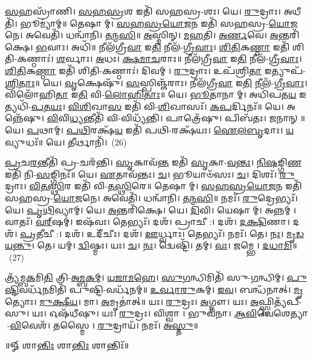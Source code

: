\-\ul{𑌸}\-𑌹𑌸𑍍𑌰𑌾᳴𑌣𑌿। \ul{𑌸}\-\-\ul{𑌹}\-\-\ul{𑌸𑍍𑌰}\-𑌶 𑌇𑌤𑌿᳴ 𑌸𑌹𑌸𑍍𑌰-𑌶𑌃। 𑌯𑍇। \ul{𑌰𑍁}\-𑌦𑍍𑌰𑌾𑌃। 𑌅𑌧𑍀𑌤𑌿᳴। 𑌭𑍂𑌮𑍍𑌯𑌾॑𑌮𑍍॥ 
𑌤𑍇𑌷𑌾𑌮𑍍। \ul{𑌸}\-\-\ul{𑌹}\-\-\ul{𑌸𑍍𑌰}\-\-\ul{𑌯𑍋}\-\-\ul{𑌜}\-𑌨 𑌇𑌤𑌿᳴ 𑌸𑌹𑌸𑍍𑌰-\-\ul{𑌯𑍋}\-\-\ul{𑌜}\-𑌨𑍇। 𑌅𑌵𑍇𑌤𑌿᳴। 𑌧𑌨𑍍𑌵𑌾᳴𑌨𑌿। \ul{𑌤}\-\-\ul{𑌨𑍍𑌮}\-\-\ul{𑌸𑌿}\-॥ 
\-\ul{𑌅}\-𑌸𑍍𑌮𑌿𑌨𑍍। \ul{𑌮}\-\-\ul{𑌹}\-𑌤𑌿। \ul{𑌅}\-\-\ul{𑌰𑍍𑌣}\-𑌵𑍇। \ul{𑌅}\-𑌨𑍍𑌤𑌰𑌿᳴𑌕𑍍𑌷𑍇। \ul{𑌭}\-𑌵𑌾𑌃। 𑌅𑌧𑌿᳴॥ 
𑌨𑍀𑌲᳴𑌗𑍍𑌰𑍀\-\ul{𑌵𑌾} 𑌇\-\ul{𑌤𑌿} 𑌨𑍀𑌲᳴-\-\ul{𑌗𑍍𑌰𑍀}\-\-\ul{𑌵𑌾𑌃}\-। \ul{𑌶𑌿}\-\-\ul{𑌤𑌿}\-𑌕\-\ul{𑌣𑍍𑌠𑌾} 𑌇𑌤𑌿᳴ 𑌶𑌿𑌤𑌿-𑌕𑌣𑍍𑌠𑌾𑌃॑। \ul{𑌶}\-𑌰𑍍𑌵𑌾𑌃। \ul{𑌅}\-𑌧𑌃। \ul{𑌕𑍍𑌷}\-\-\ul{𑌮𑌾}\-\-\ul{𑌚}\-𑌰𑌾𑌃॥ 
𑌨𑍀𑌲᳴𑌗𑍍𑌰𑍀\-\ul{𑌵𑌾} 𑌇\-\ul{𑌤𑌿} 𑌨𑍀𑌲᳴-\-\ul{𑌗𑍍𑌰𑍀}\-\-\ul{𑌵𑌾𑌃}\-। \ul{𑌶𑌿}\-\-\ul{𑌤𑌿}\-𑌕\-\ul{𑌣𑍍𑌠𑌾} 𑌇𑌤𑌿᳴ 𑌶𑌿𑌤𑌿-𑌕𑌣𑍍𑌠𑌾𑌃॑। 𑌦𑌿𑌵𑌮𑍍। \ul{𑌰𑍁}\-𑌦𑍍𑌰𑌾𑌃। 𑌉𑌪᳴𑌶𑍍𑌰𑌿\-\ul{𑌤𑌾} 𑌇𑌤𑍍𑌯𑍁𑌪᳴-\-\ul{𑌶𑍍𑌰𑌿}\-\-\ul{𑌤𑌾𑌃}\-॥ 
𑌯𑍇। \ul{𑌵𑍃}\-𑌕𑍍𑌷𑍇𑌷𑍁᳴। \ul{𑌸}\-𑌸𑍍𑌪𑌿𑌞𑍍𑌜᳴𑌰𑌾𑌃। 𑌨𑍀𑌲᳴𑌗𑍍𑌰𑍀\-\ul{𑌵𑌾} 𑌇\-\ul{𑌤𑌿} 𑌨𑍀𑌲᳴-\-\ul{𑌗𑍍𑌰𑍀}\-\-\ul{𑌵𑌾𑌃}\-। 𑌵𑌿𑌲𑍋᳴𑌹𑌿\-\ul{𑌤𑌾} 𑌇\-\ul{𑌤𑌿} 𑌵𑌿-\-\ul{𑌲𑍋}\-\-\ul{𑌹𑌿}\-\-\ul{𑌤𑌾𑌃}\-॥ 
𑌯𑍇। \ul{𑌭𑍂}\-𑌤𑌾𑌨𑌾𑌮𑍍। 𑌅𑌧𑌿᳴𑌪𑌤\-\ul{𑌯} 𑌇𑌤𑍍𑌯𑌧𑌿᳴-\-\ul{𑌪}\-\-\ul{𑌤}\-\-\ul{𑌯𑌃}\-। \ul{𑌵𑌿}\-\-\ul{𑌶𑌿}\-𑌖𑌾\-\ul{𑌸} 𑌇𑌤𑌿᳴ 𑌵𑌿-\-\ul{𑌶𑌿}\-𑌖𑌾𑌸𑌃᳴। \ul{𑌕}\-\-\ul{𑌪}\-𑌰𑍍𑌦𑌿𑌨𑌃᳴॥ 
𑌯𑍇। 𑌅𑌨𑍍𑌨𑍇᳴𑌷𑍁। \ul{𑌵𑌿}\-𑌵𑌿\-\ul{𑌧𑍍𑌯}\-𑌨𑍍𑌤𑍀𑌤𑌿᳴ 𑌵𑌿-𑌵𑌿𑌧𑍍𑌯᳴𑌨𑍍𑌤𑌿। 𑌪𑌾𑌤𑍍𑌰𑍇᳴𑌷𑍁। 𑌪𑌿𑌬᳴𑌤𑌃। 𑌜𑌨𑌾𑌨𑍍॥ 
𑌯𑍇। \ul{𑌪}\-𑌥𑌾𑌮𑍍। \ul{𑌪}\-\-\ul{𑌥𑌿}\-𑌰𑌕𑍍𑌷᳴\-\ul{𑌯} 𑌇𑌤𑌿᳴ 𑌪𑌥𑌿-𑌰𑌕𑍍𑌷᳴𑌯𑌃। \ul{𑌐}\-\-\ul{𑌲}\-\-\ul{𑌬𑍃}\-𑌦𑌾𑌃। \ul{𑌯}\-𑌵𑍍𑌯𑍁𑌧𑌃᳴॥ 
𑌯𑍇। \ul{𑌤𑍀}\-𑌰𑍍𑌥𑌾𑌨𑌿᳴।~(26)


\-\ul{𑌪𑍍𑌰}\-𑌚\-\ul{𑌰}\-𑌨𑍍𑌤𑍀𑌤𑌿᳴ 𑌪𑍍𑌰-𑌚𑌰᳴𑌨𑍍𑌤𑌿। \ul{𑌸𑍃}\-𑌕𑌾𑌵᳴\-\ul{𑌨𑍍𑌤} 𑌇𑌤𑌿᳴ \ul{𑌸𑍃}\-𑌕𑌾-\-\ul{𑌵}\-\-\ul{𑌨𑍍𑌤𑌃}\-। \ul{𑌨𑌿}\-\-\ul{𑌷}\-𑌙𑍍𑌗𑌿\-\ul{𑌣} 𑌇𑌤𑌿᳴ 𑌨𑌿-\-\ul{𑌸}\-𑌙𑍍𑌗𑌿𑌨𑌃᳴॥ 
𑌯𑍇। \ul{𑌏}\-𑌤𑌾𑌵᳴𑌨𑍍𑌤𑌃। \ul{𑌚}\-। 𑌭𑍂𑌯𑌾𑍞᳴𑌸𑌃। \ul{𑌚}\-। 𑌦𑌿𑌶𑌃᳴। \ul{𑌰𑍁}\-𑌦𑍍𑌰𑌾𑌃। \ul{𑌵𑌿}\-\-\ul{𑌤}\-\-\ul{𑌸𑍍𑌥𑌿}\-𑌰 𑌇𑌤𑌿᳴ 𑌵𑌿-\-\ul{𑌤}\-\-\ul{𑌸𑍍𑌥𑌿}\-𑌰𑍇॥ 
𑌤𑍇𑌷𑌾𑌮𑍍। \ul{𑌸}\-\-\ul{𑌹}\-\-\ul{𑌸𑍍𑌰}\-\-\ul{𑌯𑍋}\-\-\ul{𑌜}\-𑌨 𑌇𑌤𑌿᳴ 𑌸𑌹𑌸𑍍𑌰-\-\ul{𑌯𑍋}\-\-\ul{𑌜}\-𑌨𑍇। 𑌅𑌵𑍇𑌤𑌿᳴। 𑌧𑌨𑍍𑌵𑌾᳴𑌨𑌿। \ul{𑌤}\-\-\ul{𑌨𑍍𑌮}\-\-\ul{𑌸𑌿}\-॥ 
𑌨𑌮𑌃᳴। \ul{𑌰𑍁}\-𑌦𑍍𑌰𑍇𑌭𑍍𑌯𑌃᳴। 𑌯𑍇। \ul{𑌪𑍃}\-\-\ul{𑌥𑌿}\-𑌵𑍍𑌯𑌾𑌮𑍍। 𑌯𑍇। \ul{𑌅}\-𑌨𑍍𑌤𑌰𑌿᳴𑌕𑍍𑌷𑍇। 𑌯𑍇। \ul{𑌦𑌿}\-𑌵𑌿। 𑌯𑍇𑌷𑌾𑌮𑍍। 𑌅𑌨𑍍𑌨𑌮𑍍। 𑌵𑌾𑌤𑌃᳴। \ul{𑌵}\-\-\ul{𑌰𑍍}\-‌𑌷𑌮𑍍।
 𑌇𑌷᳴𑌵𑌃। 𑌤𑍇𑌭𑍍𑌯𑌃᳴। 𑌦𑌶᳴। 𑌪𑍍𑌰𑌾𑌚𑍀:। 𑌦𑌶᳴। \ul{𑌦}\-\-\ul{𑌕𑍍𑌷𑌿}\-𑌣𑌾। 𑌦𑌶᳴। \ul{𑌪𑍍𑌰}\-𑌤𑍀𑌚𑍀:। 𑌦𑌶᳴। 𑌉𑌦𑍀᳴𑌚𑍀𑌃। 𑌦𑌶᳴। \ul{𑌊}\-𑌰𑍍𑌧𑍍𑌵𑌾𑌃।
  𑌤𑍇𑌭𑍍𑌯𑌃᳴। 𑌨𑌮𑌃᳴। 𑌤𑍇। \ul{𑌨𑌃}\-। \ul{𑌮𑍃}\-\-\ul{𑌡}\-\-\ul{𑌯}\-\-\ul{𑌨𑍍𑌤𑍁}\-। 𑌤𑍇। 𑌯𑌮𑍍। \ul{𑌦𑍍𑌵𑌿}\-𑌷𑍍𑌮𑌃। 𑌯𑌃। \ul{𑌚}\-। \ul{𑌨𑌃}\-। 𑌦𑍍𑌵𑍇𑌷𑍍𑌟𑌿᳴। 𑌤𑌮𑍍। \ul{𑌵𑌃}\-। 𑌜𑌮𑍍𑌭𑍇। \ul{𑌦}\-\-\ul{𑌧𑌾}\-\-\ul{𑌮𑌿}\-॥~(27)

𑌤𑍍𑌰𑍍𑌯᳴𑌮𑍍𑌬\-\ul{𑌕}\-𑌮𑌿\-\ul{𑌤𑌿} 𑌤𑍍𑌰𑌿-\-\ul{𑌅}\-\-\ul{𑌮𑍍𑌬}\-\-\ul{𑌕}\-\-\ul{𑌮𑍍}\-। \ul{𑌯}\-\-\ul{𑌜𑌾}\-\-\ul{𑌮}\-\-\ul{𑌹𑍇}\-। \ul{𑌸𑍁}\-\-\ul{𑌗}\-𑌨𑍍𑌧𑌿𑌮𑌿𑌤𑌿᳴ 𑌸𑍁-\-\ul{𑌗}\-𑌨𑍍𑌧𑌿𑌮𑍍। \ul{𑌪𑍁}\-\-\ul{𑌷𑍍𑌟𑌿}\-𑌵𑌰𑍍𑌧᳴\-\ul{𑌨}\-𑌮𑌿𑌤𑌿᳴ 𑌪𑍁𑌷𑍍𑌟𑌿-𑌵𑌰𑍍𑌧᳴𑌨𑌮𑍍॥ 
\-\ul{𑌉}\-\-\ul{𑌰𑍍𑌵𑌾}\-\-\ul{𑌰𑍁}\-𑌕𑌮𑍍। \ul{𑌇}\-\-\ul{𑌵}\-। 𑌬𑌨𑍍𑌧᳴𑌨𑌾𑌤𑍍। \ul{𑌮𑍃}\-𑌤𑍍𑌯𑍋𑌃। \ul{𑌮𑍁}\-\-\ul{𑌕𑍍𑌷𑍀}\-\-\ul{𑌯}\-। 𑌮𑌾। \ul{𑌅}\-𑌮𑍃𑌤𑌾॑𑌤𑍍॥ 
𑌯𑌃। \ul{𑌰𑍁}\-𑌦𑍍𑌰𑌃। \ul{𑌅}\-𑌗𑍍𑌨𑍗। 𑌯𑌃। \ul{𑌅}\-𑌫𑍍𑌸𑍍𑌵𑌿𑌤𑍍𑌯᳴𑌪𑍍-𑌸𑍁। 𑌯𑌃। 𑌓𑌷᳴𑌧𑍀𑌷𑍁। 𑌯𑌃। \ul{𑌰𑍁}\-𑌦𑍍𑌰𑌃। 𑌵𑌿𑌶𑍍𑌵𑌾। 𑌭𑍁𑌵᳴𑌨𑌾। \ul{𑌆}\-\-\ul{𑌵𑌿}\-𑌵𑍇𑌶𑍇𑌤𑍍𑌯𑌾-\-\ul{𑌵𑌿}\-𑌵𑍇𑌶᳴। 𑌤𑌸𑍍𑌮𑍈। \ul{𑌰𑍁}\-𑌦𑍍𑌰𑌾𑌯᳴। 𑌨𑌮𑌃᳴। \ul{𑌅}\-\-\ul{𑌸𑍍𑌤𑍁}\-॥

\centerline{॥𑍐 𑌶𑌾\-\ul{𑌨𑍍𑌤𑌿𑌃} 𑌶𑌾\-\ul{𑌨𑍍𑌤𑌿𑌃} 𑌶𑌾𑌨𑍍𑌤𑌿𑌃᳴॥}


